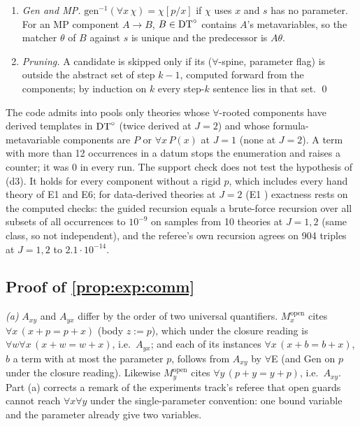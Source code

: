 \begin{enumerate}[label=(d\arabic*),leftmargin=*,itemsep=1pt]
\item \emph{Gen and MP.} $\mathrm{gen}^{-1}(\forall x\,\chi)=\chi[p/x]$ if $\chi$ uses $x$ and $s$ has no parameter. For an MP component $A\to B$, $B\in\mathrm{DT}^{\circ}$ contains $A$'s metavariables, so the matcher $\theta$ of $B$ against $s$ is unique and the predecessor is $A\theta$.
\item \emph{Pruning.} A candidate is skipped only if its ($\forall$-spine, parameter flag) is outside the abstract set of step $k-1$, computed forward from the components; by induction on $k$ every step-$k$ sentence lies in that set. \qed
\end{enumerate}

\noindent The code admits into \Lone{} pools only theories whose $\forall$-rooted components have derived templates in $\mathrm{DT}^{\circ}$ (twice derived at $J=2$) and whose formula-metavariable components are $P$ or $\forall x\,P(x)$ at $J=1$ (none at $J=2$). A term with more than 12 occurrences in a datum stops the enumeration and raises a counter; it was $0$ in every run. The support check does not test the hypothesis of (d3). It holds for every component without a rigid $p$, which includes every hand theory of E1 and E6; for data-derived theories at $J=2$ (E1 ) exactness rests on the computed checks: the guided recursion equals a brute-force recursion over all subsets of all occurrences to $10^{-9}$ on samples from 10 theories at $J=1,2$ (same class, so not independent), and the referee's own recursion agrees on 904 triples at $J=1,2$ to $2.1\cdot10^{-14}$.

\subsection{Proof of \texorpdfstring{\cref{prop:exp:comm}}{the commutativity proposition}}\label{app:exp:comm}

\emph{(a)} $A_{xy}$ and $A_{yx}$ differ by the order of two universal quantifiers. $M_x^{\mathrm{open}}$ cites $\forall x\,(x+p=p+x)$ (body $z:=p$), which under the closure reading is $\forall w\forall x\,(x+w=w+x)$, i.e.\ $A_{yx}$; and each of its instances $\forall x\,(x+b=b+x)$, $b$ a term with at most the parameter $p$, follows from $A_{xy}$ by $\forall$E (and Gen on $p$ under the closure reading). Likewise $M_y^{\mathrm{open}}$ cites $\forall y\,(p+y=y+p)$, i.e.\ $A_{xy}$. Part (a) corrects a remark of the experiments track's referee that open guards cannot reach $\forall x\forall y$ under the single-parameter convention: one bound variable and the parameter already give two variables.

